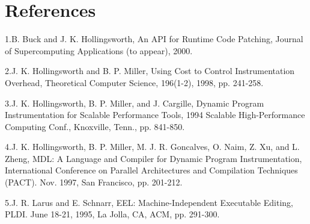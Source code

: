 \section{References}

\bigskip

{
1.B. Buck and J. K. Hollingsworth, {\textquotedbl}An API for Runtime Code Patching,{\textquotedbl} Journal of
Supercomputing Applications (to appear), 2000.}

{
2.J. K. Hollingsworth and B. P. Miller, {\textquotedbl}Using Cost to Control Instrumentation
Overhead,{\textquotedbl} Theoretical Computer Science, 196(1-2), 1998, pp. 241-258.}

{
3.J. K. Hollingsworth, B. P. Miller, and J. Cargille, {\textquotedbl}Dynamic Program Instrumentation for Scalable
Performance Tools,{\textquotedbl} 1994 Scalable High-Performance Computing Conf., Knoxville, Tenn., pp. 841-850.}

{
4.J. K. Hollingsworth, B. P. Miller, M. J. R. Goncalves, O. Naim, Z. Xu, and L. Zheng, {\textquotedbl}MDL: A
Language and Compiler for Dynamic Program Instrumentation,{\textquotedbl} International Conference on Parallel
Architectures and Compilation Techniques (PACT). Nov. 1997, San Francisco, pp. 201-212.}

{
5.J. R. Larus and E. Schnarr, {\textquotedbl}EEL: Machine-Independent Executable Editing,{\textquotedbl} PLDI. June
18-21, 1995, La Jolla, CA, ACM, pp. 291-300.}
